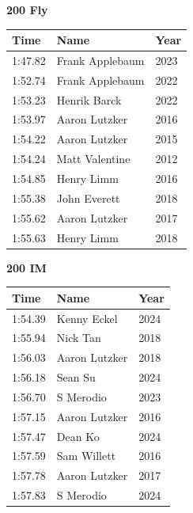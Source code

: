 \vspace{1.2em}
\noindent\begin{minipage}[t]{0.48\textwidth}
\centering
\textbf{\textcolor{teamprimary}{200 Fly}}\par
\vspace{0.5em}
\centering
\small
\renewcommand{\arraystretch}{1.0}
\setlength{\tabcolsep}{4pt}
\begin{tabular}{@{}p{1.8cm}p{3.0cm}p{1.0cm}@{}}
\toprule
\textbf{Time} & \textbf{Name} & \textbf{Year} \\
\midrule
1:47.82 & Frank Applebaum & 2023 \\
1:52.74 & Frank Applebaum & 2022 \\
1:53.23 & Henrik Barck & 2022 \\
1:53.97 & Aaron Lutzker & 2016 \\
1:54.22 & Aaron Lutzker & 2015 \\
1:54.24 & Matt Valentine & 2012 \\
1:54.85 & Henry Limm & 2016 \\
1:55.38 & John Everett & 2018 \\
1:55.62 & Aaron Lutzker & 2017 \\
1:55.63 & Henry Limm & 2018 \\
\bottomrule
\end{tabular}
\end{minipage}
\hfill
\begin{minipage}[t]{0.48\textwidth}
\centering
\textbf{\textcolor{teamprimary}{200 IM}}\par
\vspace{0.5em}
\centering
\small
\renewcommand{\arraystretch}{1.0}
\setlength{\tabcolsep}{4pt}
\begin{tabular}{@{}p{1.8cm}p{3.0cm}p{1.0cm}@{}}
\toprule
\textbf{Time} & \textbf{Name} & \textbf{Year} \\
\midrule
1:54.39 & Kenny Eckel & 2024 \\
1:55.94 & Nick Tan & 2018 \\
1:56.03 & Aaron Lutzker & 2018 \\
1:56.18 & Sean Su & 2024 \\
1:56.70 & S Merodio & 2023 \\
1:57.15 & Aaron Lutzker & 2016 \\
1:57.47 & Dean Ko & 2024 \\
1:57.59 & Sam Willett & 2016 \\
1:57.78 & Aaron Lutzker & 2017 \\
1:57.83 & S Merodio & 2024 \\
\bottomrule
\end{tabular}
\end{minipage}
